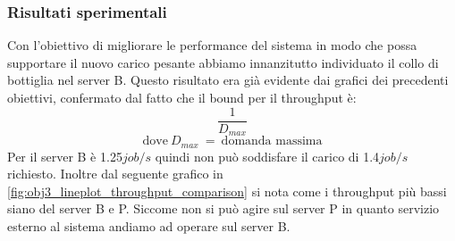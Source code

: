 \subsubsection{Risultati sperimentali}
Con l'obiettivo di migliorare le performance del sistema in modo che possa supportare il nuovo carico pesante abbiamo innanzitutto individuato il collo di bottiglia nel server B. Questo risultato era già evidente dai grafici dei precedenti obiettivi, confermato dal fatto che il bound per il throughput è:
$$\frac{1}{D_{max}}$$ $$\text{dove}\ D_{max}\ =\ \text{domanda massima}$$
Per il server B è 1.25$job/s$ quindi non può soddisfare il carico di 1.4$job/s$ richiesto. Inoltre dal seguente grafico in \autoref{fig:obj3_lineplot_throughput_comparison} si nota come i throughput più bassi siano del server B e P. Siccome non si può agire sul server P in quanto servizio esterno al sistema andiamo ad operare sul server B. 

